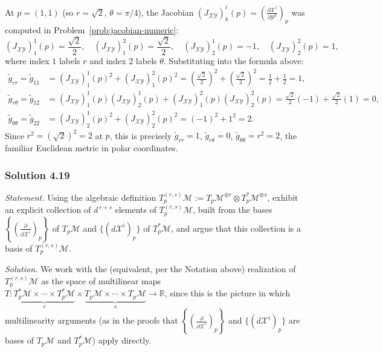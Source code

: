 \documentclass[11pt]{article}
\newcommand{\TpM}{T_p\mathcal M}
\newcommand{\TpsM}{T_p^*\mathcal M}
\newcommand{\TprsM}{T_p^{(r,s)}\mathcal M}
\begin{document}
At $p=(1,1)$ (so $r=\sqrt2$, $\theta=\pi/4$), the Jacobian
$(J_{\mathcal{XY}})^i_k(p)=\left(\frac{\partial\mathcal
X^i}{\partial\mathcal Y^k}\right)_p$ was computed in
Problem~\ref{prob:jacobian-numeric}:
\[
(J_{\mathcal{XY}})^1_1(p)=\frac{\sqrt2}{2},\quad (J_{\mathcal{XY}})^2_1(p)=\frac{\sqrt2}{2},\quad (J_{\mathcal{XY}})^1_2(p)=-1,\quad (J_{\mathcal{XY}})^2_2(p)=1,
\]
where index $1$ labels $r$ and index $2$ labels $\theta$. Substituting into
the formula above:
\begin{align*}
\widetilde g_{rr} = \widetilde g_{11} &= (J_{\mathcal{XY}})^1_1(p)^2+(J_{\mathcal{XY}})^2_1(p)^2 = \left(\frac{\sqrt2}{2}\right)^2+\left(\frac{\sqrt2}{2}\right)^2 = \frac12+\frac12=1, \\
\widetilde g_{r\theta} = \widetilde g_{12} &= (J_{\mathcal{XY}})^1_1(p)(J_{\mathcal{XY}})^1_2(p)+(J_{\mathcal{XY}})^2_1(p)(J_{\mathcal{XY}})^2_2(p) = \frac{\sqrt2}{2}(-1)+\frac{\sqrt2}{2}(1) = 0, \\
\widetilde g_{\theta\theta} = \widetilde g_{22} &= (J_{\mathcal{XY}})^1_2(p)^2+(J_{\mathcal{XY}})^2_2(p)^2 = (-1)^2+1^2 = 2.
\end{align*}
Since $r^2=(\sqrt2)^2=2$ at $p$, this is precisely
$\widetilde g_{rr}=1$, $\widetilde g_{r\theta}=0$,
$\widetilde g_{\theta\theta}=r^2=2$, the familiar Euclidean metric in polar
coordinates.

\subsubsection*{Solution 4.19}

\noindent\textit{Statement.} Using the algebraic definition
$\TprsM:=\TpM^{\otimes r}\otimes\TpsM^{\otimes s}$, exhibit an explicit
collection of $d^{\,r+s}$ elements of $\TprsM$, built from the bases
$\left\{\left(\frac{\partial}{\partial\mathcal X^i}\right)_p\right\}$ of
$\TpM$ and $\{(d\mathcal X^i)_p\}$ of $\TpsM$, and argue that this
collection is a basis of $\TprsM$.

\medskip
\noindent\textit{Solution.} We work with the (equivalent, per the Notation
above) realization of $\TprsM$ as the space of multilinear maps
$T:\underbrace{\TpsM\times\cdots\times\TpsM}_{r}\times\underbrace{\TpM\times\cdots\times\TpM}_{s}\to\mathbb R$,
since this is the picture in which multilinearity arguments (as in the
proofs that $\left\{\left(\frac{\partial}{\partial\mathcal
X^i}\right)_p\right\}$ and $\{(d\mathcal X^i)_p\}$ are bases of $\TpM$ and
$\TpsM$) apply directly.
\end{document}
